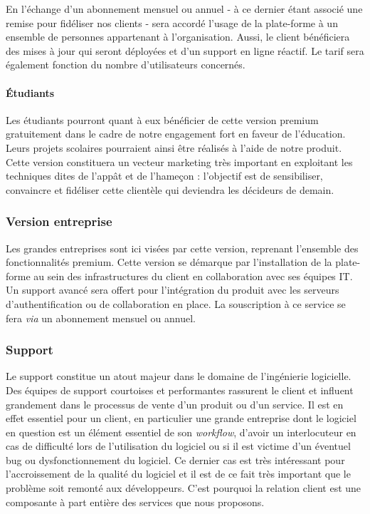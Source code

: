 \documentclass[10pt,twocolumn,a4paper,utf8x]{article}
\begin{document}
En l'échange d'un abonnement mensuel ou annuel - à ce dernier étant
associé une remise pour fidéliser nos clients - sera accordé l'usage de
la plate-forme à un ensemble de personnes appartenant à l'organisation.
Aussi, le client bénéficiera des mises à jour qui seront déployées et
d'un support en ligne réactif. Le tarif sera également fonction du
nombre d'utilisateurs concernés.

\paragraph{Étudiants}

Les étudiants pourront quant à eux bénéficier de cette version premium
gratuitement dans le cadre de notre engagement fort en faveur de
l'éducation. Leurs projets scolaires pourraient ainsi être réalisés à
l'aide de notre produit. Cette version constituera un vecteur marketing
très important en exploitant les techniques dites de l'appât et de
l'hameçon : l'objectif est de sensibiliser, convaincre et fidéliser
cette clientèle qui deviendra les décideurs de demain.

\subsubsection{Version entreprise}

Les grandes entreprises sont ici visées par cette version, reprenant
l'ensemble des fonctionnalités premium. Cette version se démarque par
l'installation de la plate-forme au sein des infrastructures du client
en collaboration avec ses équipes IT. Un support avancé sera offert pour
l'intégration du produit avec les serveurs d'authentification ou de
collaboration en place. La souscription à ce service se fera \emph{via}
un abonnement mensuel ou annuel.

\subsubsection{Support}

Le support constitue un atout majeur dans le domaine de l'ingénierie
logicielle. Des équipes de support courtoises et performantes rassurent
le client et influent grandement dans le processus de vente d'un produit
ou d'un service. Il est en effet essentiel pour un client, en
particulier une grande entreprise dont le logiciel en question est un
élément essentiel de son \emph{workflow}, d'avoir un interlocuteur en
cas de difficulté lors de l'utilisation du logiciel ou si il est victime
d'un éventuel bug ou dysfonctionnement du logiciel. Ce dernier cas est
très intéressant pour l'accroissement de la qualité du logiciel et il
est de ce fait très important que le problème soit remonté aux
développeurs. C'est pourquoi la relation client est une composante à
part entière des services que nous proposons.
\end{document}
